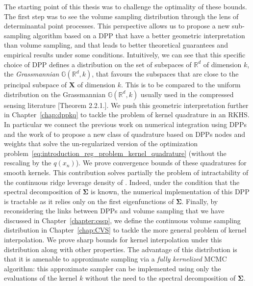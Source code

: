 \documentclass[twoside,11pt]{book}
\numberwithin{theorem}{chapter}
\numberwithin{definition}{chapter}
\numberwithin{proposition}{chapter}
\numberwithin{corollary}{chapter}
\numberwithin{example}{chapter}
\numberwithin{lemma}{chapter}
\numberwithin{assumption}{chapter}
\numberwithin{equation}{chapter}
\numberwithin{figure}{chapter}
\begin{document}
The starting point of this thesis was to challenge the optimality of these bounds. The first step was to see the volume sampling distribution through the lens of determinantal point processes. This perspective allows us to propose a new sub-sampling algorithm based on a DPP that have a better geometric interpretation than volume sampling, and that leads to better theoretical guarantees and empirical results under some conditions. Intuitively, we can see that this specific choice of DPP defines a distribution on the set of subspaces of $\mathbb{R}^{d}$ of dimension $k$, the \emph{Grassmannian} $\mathbb{G}(\mathbb{R}^{d},k)$, that favours the subspaces that are close to the principal subspace of $\bm{X}$ of dimension $k$. This is to be compared to the uniform distribution on the Grassmannian $\mathbb{G}(\mathbb{R}^{d},k)$ usually used in the compressed sensing literature \citep{Chi12}[Theorem 2.2.1.]. We push this geometric interpretation further in Chapter~\ref{chap:dppkq} to tackle the problem of kernel quadrature in an RKHS. In particular we connect the previous work on numerical integration using DPPs \citep{BaHa16,CoMaAm20} and the work of \citep{Bac17} to propose a new class of quadrature based on DPPs nodes and weights that solve the un-regularized version of the optimization problem~\ref{eq:introduction_reg_problem_kernel_quadrature} (without the rescaling by the $q(x_{n})$). We prove convergence bounds of these quadratures for smooth kernels. This contribution solves partially the problem of intractability of the continuous ridge leverage density of \citep{Bac17}. Indeed, under the condition that the spectral decomposition of $\bm{\Sigma}$ is known, the numerical implementation of this DPP is tractable as it relies only on the first eigenfunctions of $\bm{\Sigma}$. Finally, by reconsidering the links between DPPs and volume sampling that we have discussed in Chapter~\ref{chapter:cssp}, we define the continuous volume sampling distribution in Chapter~\ref{chap:CVS} to tackle the more general problem of kernel interpolation. We prove sharp bounds for kernel interpolation under this distribution along with other properties. The advantage of this distribution is that it is amenable to approximate sampling via a \emph{fully kernelized} MCMC algorithm: this approximate sampler can be implemented using only the evaluations of the kernel $k$ without the need to the spectral decomposition of $\bm{\Sigma}$.

\end{document}
